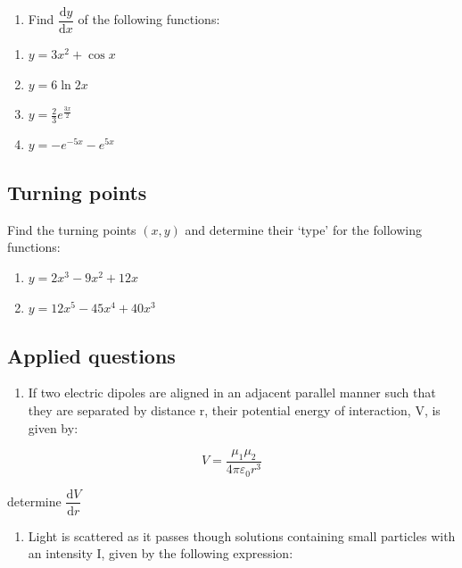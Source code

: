 \documentclass[
]{book}
\providecommand{\tightlist}{%
  \setlength{\itemsep}{0pt}\setlength{\parskip}{0pt}}
\begin{document}
\begin{enumerate}
\def\labelenumi{\arabic{enumi}.}
\setcounter{enumi}{1}
\tightlist
\item
  Find \(\dfrac{\textrm{d}y}{\textrm{d}x}\) of the following functions:
\end{enumerate}

\begin{enumerate}
\def\labelenumi{\alph{enumi}.}
\tightlist
\item
  \(y = 3x^2 + \cos x\)
\item
  \(y = 6 \ln 2x\)
\item
  \(y = \frac{2}{3}e^{\frac{3x}{2}}\)
\item
  \(y = -e^{-5x}-e^{5x}\)
\end{enumerate}

\hypertarget{turning-points}{%
\subsection{Turning points}\label{turning-points}}

Find the turning points \((x,y)\) and determine their `type' for the following functions:

\begin{enumerate}
\def\labelenumi{\arabic{enumi}.}
\tightlist
\item
  \(y = 2x^3 - 9x^2 + 12x\)
\item
  \(y = 12x^5 - 45x^4 + 40x^3\)
\end{enumerate}

\hypertarget{applied-questions}{%
\subsection{Applied questions}\label{applied-questions}}

\begin{enumerate}
\def\labelenumi{\arabic{enumi}.}
\tightlist
\item
  If two electric dipoles are aligned in an adjacent parallel manner such that they are separated by distance r, their potential energy of interaction, V, is given by:
\end{enumerate}

\begin{equation*}
V = \frac{\mu_1 \mu_2}{4 \pi \varepsilon_0 r^3}
\end{equation*}

determine \(\dfrac{\textrm{d}V}{\textrm{d}r}\)

\begin{enumerate}
\def\labelenumi{\arabic{enumi}.}
\setcounter{enumi}{1}
\tightlist
\item
  Light is scattered as it passes though solutions containing small particles with an intensity I, given by the following expression:
\end{enumerate}
\end{document}
